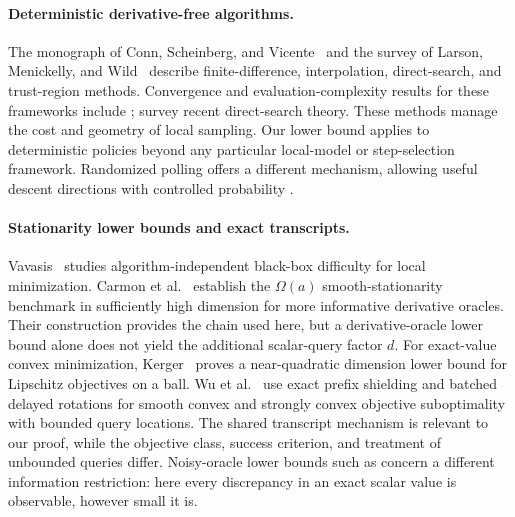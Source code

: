 \documentclass[11pt]{article}
\numberwithin{equation}{section}
\theoremstyle{definition}
\theoremstyle{remark}
\begin{document}
\paragraph{Deterministic derivative-free algorithms.}
The monograph of Conn, Scheinberg, and Vicente~\cite{CSV2009} and the
survey of Larson, Menickelly, and Wild~\cite{LMW2019} describe
finite-difference, interpolation, direct-search, and trust-region methods.
Convergence and evaluation-complexity results for these frameworks include
\citet{CSV2009TR,GJV2016,Vicente2013,CGT2012};
\citet{DRRZ2025} survey recent direct-search theory.
These methods manage the cost and geometry of local sampling. Our lower
bound applies to deterministic policies beyond any particular local-model
or step-selection framework. Randomized polling offers a different
mechanism, allowing useful descent directions with controlled probability
\cite{GRVZ2015}.

\paragraph{Stationarity lower bounds and exact transcripts.}
Vavasis~\cite{Vavasis1993} studies algorithm-independent black-box
difficulty for local minimization. Carmon et al.~\cite{CDHS2020}
establish the $\Omega(a)$ smooth-stationarity benchmark in sufficiently
high dimension for more informative derivative oracles. Their construction
provides the chain used here, but a derivative-oracle lower bound alone
does not yield the additional scalar-query factor $d$.
For exact-value convex minimization, Kerger~\cite{Kerger2026} proves a
near-quadratic dimension lower bound for Lipschitz objectives on a ball.
Wu et al.~\cite{WuEtAl2026Convex,WuEtAl2026SC} use exact prefix shielding
and batched delayed rotations for smooth convex and strongly convex
objective suboptimality with bounded query locations. The shared
transcript mechanism is relevant to our proof, while the objective class,
success criterion, and treatment of unbounded queries differ.
Noisy-oracle lower bounds such as \citet{Shamir2013} concern a different
information restriction: here every discrepancy in an exact scalar value
is observable, however small it is.
\end{document}
